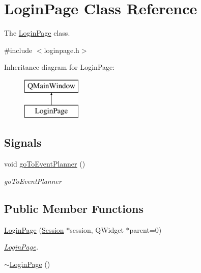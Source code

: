 \hypertarget{class_login_page}{}\section{Login\+Page Class Reference}
\label{class_login_page}


The \hyperlink{class_login_page}{Login\+Page} class.  




{\ttfamily \#include $<$loginpage.\+h$>$}

Inheritance diagram for Login\+Page\+:\begin{figure}[H]
\begin{center}
\leavevmode
\includegraphics[height=2.000000cm]{class_login_page}
\end{center}
\end{figure}
\subsection*{Signals}
\begin{DoxyCompactItemize}
\item 
void \hyperlink{class_login_page_a7b74b87a3affb709ea585fb556a57271}{go\+To\+Event\+Planner} ()
\begin{DoxyCompactList}\small\item\em go\+To\+Event\+Planner \end{DoxyCompactList}\end{DoxyCompactItemize}
\subsection*{Public Member Functions}
\begin{DoxyCompactItemize}
\item 
\hyperlink{class_login_page_aabf302d725edb6a1a0e8cca53f9b3fbf}{Login\+Page} (\hyperlink{class_session}{Session} $\ast$session, Q\+Widget $\ast$parent=0)
\begin{DoxyCompactList}\small\item\em \hyperlink{class_login_page}{Login\+Page}. \end{DoxyCompactList}\item 
\hyperlink{class_login_page_ae3c843938f34258ac50eb89d30d31d8a}{$\sim$\+Login\+Page} ()
\end{DoxyCompactItemize}


